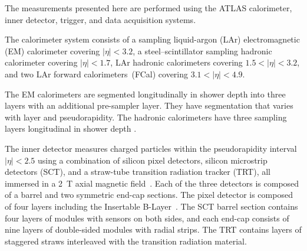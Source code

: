 

The measurements presented here are performed using the ATLAS calorimeter, inner detector, trigger, and data acquisition systems.

The calorimeter system consists of a sampling liquid-argon (LAr) electromagnetic (EM) calorimeter covering $|\eta|<3.2$, a steel--scintillator sampling hadronic calorimeter covering $|\eta| <1.7$, LAr hadronic calorimeters covering $1.5 < |\eta| < 3.2$, and two LAr forward calorimeters~(FCal) covering $3.1 < |\eta| < 4.9$.


The EM calorimeters are segmented longitudinally in shower depth into three layers with an additional pre-sampler layer.
They have segmentation that varies with layer and pseudorapidity.
The hadronic calorimeters have three sampling layers longitudinal in shower depth \cite{Aad:2008zzm}.


The inner detector measures charged particles within the pseudorapidity interval $|\eta|<2.5$ using a combination of silicon pixel detectors, silicon microstrip detectors (SCT), and a straw-tube transition radiation tracker (TRT), all immersed in a 2~T axial magnetic field~\cite{Aad:2008zzm}.
Each of the three detectors is composed of a barrel and two symmetric end-cap sections.
The pixel detector is composed of four layers including the Insertable B-Layer~\cite{ibl1,ibl2}.
The SCT barrel section contains four layers of modules with sensors on both sides, and each end-cap consists of nine layers of double-sided modules with radial strips.
The TRT contains layers of staggered straws interleaved with the transition radiation material.


